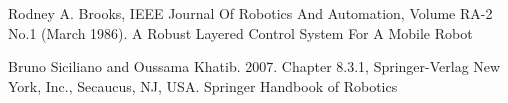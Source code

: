 \begin{thebibliography}{9}

Rodney A. Brooks, IEEE Journal Of Robotics And Automation, Volume RA-2 No.1 (March 1986).
\newblock A Robust Layered Control System For A Mobile Robot

Bruno Siciliano and Oussama Khatib. 2007. Chapter 8.3.1, Springer-Verlag New York, Inc., Secaucus, NJ, USA.
\newblock Springer Handbook of Robotics

\end{thebibliography}